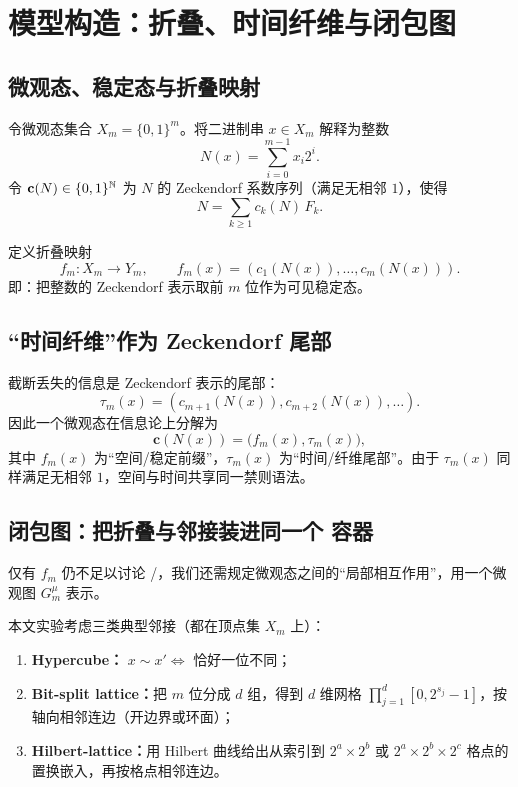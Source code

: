
\section{模型构造：折叠、时间纤维与闭包图}

\subsection{微观态、稳定态与折叠映射}

令微观态集合 $X_m=\{0,1\}^{m}$。将二进制串 $x\in X_m$ 解释为整数
\[
N(x)=\sum_{i=0}^{m-1} x_i 2^{i}.
\]
令 $\mathbf{c}(N)\in\{0,1\}^{\mathbb{N}}$ 为 $N$ 的 Zeckendorf 系数序列（满足无相邻 $1$），使得
\[
N=\sum_{k\ge 1} c_k(N)\,F_k.
\]

\begin{definition}[截断折叠]
定义折叠映射
\[
f_m:X_m\to Y_m,\qquad f_m(x)=(c_1(N(x)),\dots,c_m(N(x))).
\]
即：把整数的 Zeckendorf 表示取前 $m$ 位作为可见稳定态。
\end{definition}

\subsection{“时间纤维”作为 Zeckendorf 尾部}

截断丢失的信息是 Zeckendorf 表示的尾部：
\[
\tau_m(x)=(c_{m+1}(N(x)),c_{m+2}(N(x)),\dots).
\]
因此一个微观态在信息论上分解为
\[
\mathbf{c}(N(x))=\bigl(f_m(x),\tau_m(x)\bigr),
\]
其中 $f_m(x)$ 为“空间/稳定前缀”，$\tau_m(x)$ 为“时间/纤维尾部”。由于 $\tau_m(x)$ 同样满足无相邻 $1$，空间与时间共享同一禁则语法。

\subsection{闭包图：把折叠与邻接装进同一个 \GI{} 容器}

仅有 $f_m$ 仍不足以讨论 \WL{}/\GI{}，我们还需规定微观态之间的“局部相互作用”，用一个微观图 $G_m^{\mu}$ 表示。

\begin{definition}[微观邻接族]
本文实验考虑三类典型邻接（都在顶点集 $X_m$ 上）：
\begin{enumerate}
  \item \textbf{Hypercube：} $x\sim x' \iff$ 恰好一位不同；
  \item \textbf{Bit-split lattice：}把 $m$ 位分成 $d$ 组，得到 $d$ 维网格 $\prod_{j=1}^d [0,2^{s_j}-1]$，按轴向相邻连边（开边界或环面）；
  \item \textbf{Hilbert-lattice：}用 Hilbert 曲线给出从索引到 $2^a\times 2^b$ 或 $2^a\times 2^b\times 2^c$ 格点的置换嵌入，再按格点相邻连边。
\end{enumerate}
\end{definition}


